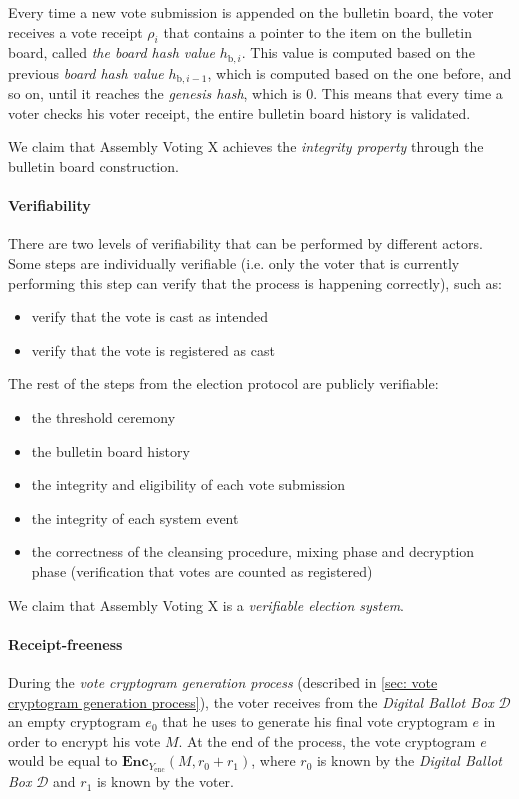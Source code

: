 Every time a new vote submission is appended on the bulletin board, the voter receives a vote receipt $\rho_i$ that contains a pointer to the item on the bulletin board, called \textit{the board hash value} $h_{\mathrm{b}, i}$. This value is computed based on the previous \textit{board hash value} $h_{\mathrm{b}, i-1}$, which is computed based on the one before, and so on, until it reaches the \textit{genesis hash}, which is 0. This means that every time a voter checks his voter receipt, the entire bulletin board history is validated.

We claim that Assembly Voting X achieves the \textit{integrity property} through the bulletin board construction.

\paragraph{Verifiability}
There are two levels of verifiability that can be performed by different actors. Some steps are individually verifiable (i.e. only the voter that is currently performing this step can verify that the process is happening correctly), such as:
\begin{itemize}
    \item verify that the vote is cast as intended
    \item verify that the vote is registered as cast
\end{itemize}
The rest of the steps from the election protocol are publicly verifiable:
\begin{itemize}
    \item the threshold ceremony
    \item the bulletin board history
    \item the integrity and eligibility of each vote submission
    \item the integrity of each system event
    \item the correctness of the cleansing procedure, mixing phase and decryption phase (verification that votes are counted as registered)
\end{itemize}

We claim that Assembly Voting X is a \textit{verifiable election system}.

\paragraph{Receipt-freeness}
During the \textit{vote cryptogram generation process} (described in \cref{sec: vote cryptogram generation process}), the voter receives from the \textit{Digital Ballot Box} $\mathcal{D}$ an empty cryptogram $e_0$ that he uses to generate his final vote cryptogram $e$ in order to encrypt his vote $M$. At the end of the process, the vote cryptogram $e$ would be equal to \( \mathbf{Enc}_{Y_\mathrm{enc}} (M, r_0 + r_1) \), where $r_0$ is known by the \textit{Digital Ballot Box} $\mathcal{D}$ and $r_1$ is known by the voter.

